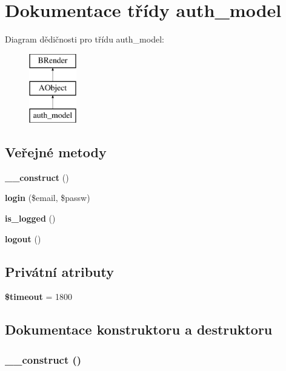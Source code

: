 \section{Dokumentace třídy auth\_\-model}
\label{dc/d6d/classauth__model}
Diagram dědičnosti pro třídu auth\_\-model:\begin{figure}[H]
\begin{center}
\leavevmode
\includegraphics[height=3cm]{dc/d6d/classauth__model}
\end{center}
\end{figure}
\subsection*{Veřejné metody}
\begin{DoxyCompactItemize}
\item 
{\bf \_\-\_\-construct} ()
\item 
{\bf login} (\$email, \$passw)
\item 
{\bf is\_\-logged} ()
\item 
{\bf logout} ()
\end{DoxyCompactItemize}
\subsection*{Privátní atributy}
\begin{DoxyCompactItemize}
\item 
{\bf \$timeout} = 1800
\end{DoxyCompactItemize}


\subsection{Dokumentace konstruktoru a destruktoru}
\subsubsection[{\_\-\_\-construct}]{\setlength{\rightskip}{0pt plus 5cm}\_\-\_\-construct ()}\label{dc/d6d/classauth__model_a095c5d389db211932136b53f25f39685}


